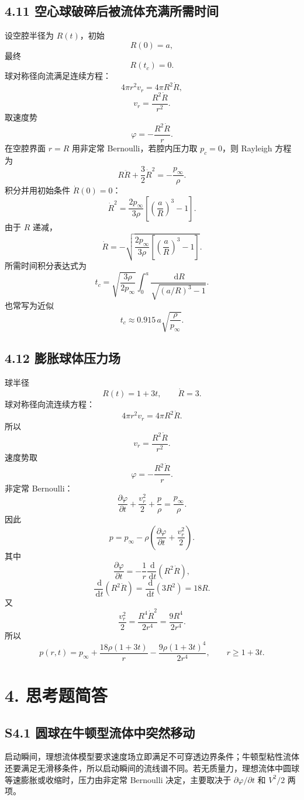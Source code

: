 \documentclass[UTF8,zihao=-4]{ctexart}
\newcommand{\dd}{\,\mathrm d}
\begin{document}
\subsection*{4.11 空心球破碎后被流体充满所需时间}

设空腔半径为 \(R(t)\)，初始
\[
R(0)=a,
\]
最终
\[
R(t_c)=0.
\]
球对称径向流满足连续方程：
\[
4\pi r^2v_r=4\pi R^2\dot R,
\]
\[
v_r=\frac{R^2\dot R}{r^2}.
\]
取速度势
\[
\varphi=-\frac{R^2\dot R}{r}.
\]
在空腔界面 \(r=R\) 用非定常 Bernoulli，若腔内压力取 \(p_c=0\)，则 Rayleigh 方程为
\[
R\ddot R+\frac32\dot R^2=-\frac{p_\infty}{\rho}.
\]
积分并用初始条件 \(\dot R(0)=0\)：
\[
\dot R^2=\frac{2p_\infty}{3\rho}
\left[\left(\frac aR\right)^3-1\right].
\]
由于 \(R\) 递减，
\[
\dot R=-\sqrt{\frac{2p_\infty}{3\rho}
\left[\left(\frac aR\right)^3-1\right]}.
\]
所需时间积分表达式为
\[
\boxed{
t_c=\sqrt{\frac{3\rho}{2p_\infty}}
\int_0^a
\frac{\dd R}{\sqrt{(a/R)^3-1}}.}
\]
也常写为近似
\[
t_c\approx0.915\,a\sqrt{\frac{\rho}{p_\infty}}.
\]

\subsection*{4.12 膨胀球体压力场}

球半径
\[
R(t)=1+3t,\qquad \dot R=3.
\]
球对称径向流连续方程：
\[
4\pi r^2v_r=4\pi R^2\dot R.
\]
所以
\[
v_r=\frac{R^2\dot R}{r^2}.
\]
速度势取
\[
\varphi=-\frac{R^2\dot R}{r}.
\]
非定常 Bernoulli：
\[
\frac{\partial\varphi}{\partial t}
+\frac{v_r^2}{2}
+\frac p\rho
=\frac{p_\infty}{\rho}.
\]
因此
\[
p=p_\infty-\rho\left(
\frac{\partial\varphi}{\partial t}
+\frac{v_r^2}{2}
\right).
\]
其中
\[
\frac{\partial\varphi}{\partial t}
=-\frac1r\frac{\dd}{\dd t}(R^2\dot R),
\]
\[
\frac{\dd}{\dd t}(R^2\dot R)
=\frac{\dd}{\dd t}(3R^2)=18R.
\]
又
\[
\frac{v_r^2}{2}
=\frac{R^4\dot R^2}{2r^4}
=\frac{9R^4}{2r^4}.
\]
所以
\[
\boxed{
p(r,t)=p_\infty
+\frac{18\rho(1+3t)}{r}
-\frac{9\rho(1+3t)^4}{2r^4},
\qquad r\ge 1+3t.}
\]

\section*{4. 思考题简答}

\subsection*{S4.1 圆球在牛顿型流体中突然移动}

启动瞬间，理想流体模型要求速度场立即满足不可穿透边界条件；牛顿型粘性流体还要满足无滑移条件，所以启动瞬间的流线谱不同。若无质量力，理想流体中圆球等速膨胀或收缩时，压力由非定常 Bernoulli 决定，主要取决于 \(\partial\varphi/\partial t\) 和 \(V^2/2\) 两项。
\end{document}
